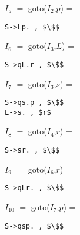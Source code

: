 \documentclass[12pt,fullpage]{exam}
\begin{document}
\begin{questions}
\begin{multicols}{2}
$I_5$ $=$ goto($I_2$,$p$) =
\begin{lstlisting}
S->Lp. , $\$$

\end{lstlisting}
\columnbreak
$I_6$ $=$ goto($I_3$,$L$) =
\begin{lstlisting}
S->qL.r , $\$$

\end{lstlisting}

$I_7$ $=$ goto($I_3$,$s$) =
\begin{lstlisting}
S->qs.p , $\$$
L->s. , $r$
\end{lstlisting}
$I_8$ $=$ goto($I_4$,$r$) =
\begin{lstlisting}
S->sr. , $\$$
\end{lstlisting}

$I_9$ $=$ goto($I_6$,$r$) =
\begin{lstlisting}
S->qLr. , $\$$
\end{lstlisting}

$I_{10}$ $=$ goto($I_7$,$p$) =
\begin{lstlisting}
S->qsp. , $\$$
\end{lstlisting}
\end{multicols}

\begin{figure}[H]


\begin{center}
\centering




\begin{tikzpicture}[x=0.75pt,y=0.75pt,yscale=-1,xscale=1]


\end{tikzpicture}
\end{center}
\end{figure}
\end{questions}
\end{document}
